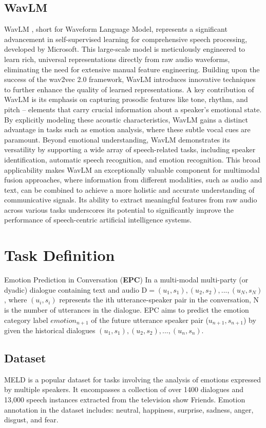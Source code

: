 \documentclass{article}
\begin{document}
\subsection{WavLM}
WavLM \cite{chen2021wavlm}, short for Waveform Language Model, represents a significant advancement in self-supervised learning for comprehensive speech processing, developed by Microsoft. This large-scale model is meticulously engineered to learn rich, universal representations directly from raw audio waveforms, eliminating the need for extensive manual feature engineering. Building upon the success of the wav2vec 2.0 framework, WavLM introduces innovative techniques to further enhance the quality of learned representations. A key contribution of WavLM is its emphasis on capturing prosodic features like tone, rhythm, and pitch – elements that carry crucial information about a speaker's emotional state. By explicitly modeling these acoustic characteristics, WavLM gains a distinct advantage in tasks such as emotion analysis, where these subtle vocal cues are paramount. Beyond emotional understanding, WavLM demonstrates its versatility by supporting a wide array of speech-related tasks, including speaker identification, automatic speech recognition, and emotion recognition. This broad applicability makes WavLM an exceptionally valuable component for multimodal fusion approaches, where information from different modalities, such as audio and text, can be combined to achieve a more holistic and accurate understanding of communicative signals. Its ability to extract meaningful features from raw audio across various tasks underscores its potential to significantly improve the performance of speech-centric artificial intelligence systems.


\section{ Task Definition}
Emotion Prediction in Conversation (\textbf{EPC}) In a multi-modal
multi-party (or dyadic) dialogue containing text and audio
$\mathrm{D} = {(u_1, s_1), (u_2, s_2), ..., (u_N, s_N)}$, where $(u_i, s_i)$ represents
the ith utterance-speaker pair in the conversation, N is
the number of utterances in the dialogue. EPC aims to predict
the emotion category label $emotion_{n+1}$ of the future utterance
speaker pair ($u_{n+1}, s_{n+1}$) by given the historical dialogues
${(u_1, s_1), (u_2, s_2), ..., (u_n, s_n)}$.

\subsection{Dataset}
MELD is a popular dataset for
tasks involving the analysis of emotions expressed by multiple
speakers. It encompasses a collection of over 1400 dialogues
and 13,000 speech instances extracted from the television show
Friends. Emotion annotation in the dataset includes: neutral,
happiness, surprise, sadness, anger, disgust, and fear.
\end{document}
